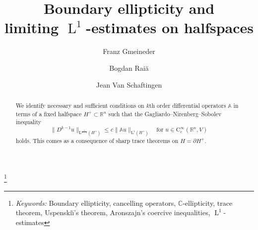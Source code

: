 \documentclass[a4paper,10pt]{amsart}
\renewcommand{\leq}{\leqslant}
\newcommand{\lebe}{\operatorname{L}}
\numberwithin{equation}{section}
\theoremstyle{remark}
\numberwithin{equation}{section}
\begin{document}
	
	\title[Boundary $\lebe^1$-estimates]{Boundary ellipticity and\\ limiting $\lebe^1$-estimates on halfspaces}
	\author[F. Gmeineder]{Franz Gmeineder}
	\author[B. Rai\cb{t}\u{a}]{Bogdan Rai\u{a}}
	\author[J. Van Schaftingen]{Jean Van Schaftingen}
	\address[F.~Gmeineder]{Universit\"{a}t Konstanz, Fachbereich Mathematik und Statistik, Universit\"{a}tsstra\ss e 10, 78464 Konstanz, Germany}
	\address[B.~Rai\cb{t}\u{a}]{Scuola Normale Superiore, Centro di Ricerca Matematica Ennio De Giorgi, P.za dei Cavalieri, 3, 56126 Pisa, Italy
	}
	\address[J.~Van Schaftingen]{Universit\'{e} catholique de Louvain, Institut de Recherche en Mathématique et Physique, Chemin du Cyclotron 2 bte L7.01.02, 1348 Louvain-la-Neuve, Belgium}
	\thanks{\emph{Keywords:} Boundary ellipticity, cancelling operators, $\mathbb{C}$-ellipticity, trace theorem, Uspenski\u{\i}'s theorem, Aronszajn's coercive inequalities, $\lebe^{1}$-estimates}
	\makeatletter
	
	
	\makeatother
	
	
	
	
	\begin{abstract}
		We identify necessary and sufficient conditions on $k$th order differential operators $\mathbb{A}$ in terms of a fixed halfspace $H^+\subset\mathbb{R}^n$ such that the Gagliardo--Nirenberg--Sobolev inequality
		$$
		\|D^{k-1}u\|_{\mathrm{L}^{\frac{n}{n-1}}(H^+)}\leq c\|\mathbb{A} u\|_{\mathrm{L}^1(H^+)}\quad\text{for }u\in\mathrm{C}^\infty_c (\mathbb{R}^{n},V)
		$$
		holds. This comes as a consequence of sharp trace theorems on $H=\partial H^+$.%
	\end{abstract}
	\maketitle
	
	
	
	
\end{document}
